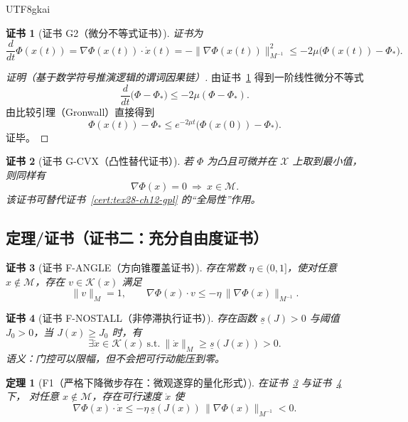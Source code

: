 \documentclass[12pt]{article}
\newtheorem{theorem}{定理}[section]
\newtheorem{Certificate}{证书}[section]
\begin{document}
\begin{CJK*}{UTF8}{gkai}
\begin{Certificate}[证书 G2（微分不等式证书）]
\label{cert:tex28-ch12-g2}
证书为
\[
  \frac{d}{dt}\Phi(x(t))
  =
  \nabla\Phi(x(t))\cdot\dot x(t)
  =
  -\|\nabla\Phi(x(t))\|_{M^{-1}}^2
  \le
  -2\mu\bigl(\Phi(x(t))-\Phi_*\bigr).
\]
\end{Certificate}

\begin{proof}[证明（基于数学符号推演逻辑的谓词因果链）]
由证书~\ref{cert:tex28-ch12-g2} 得到一阶线性微分不等式
\[
  \frac{d}{dt}\bigl(\Phi-\Phi_*\bigr)\le -2\mu(\Phi-\Phi_*).
\]
由比较引理（Gronwall）直接得到
\[
  \Phi(x(t))-\Phi_*
  \le
  e^{-2\mu t}\bigl(\Phi(x(0))-\Phi_*\bigr).
\]
证毕。
\end{proof}

\begin{Certificate}[证书 G-CVX（凸性替代证书）]
\label{cert:tex28-ch12-gcvx}
若 $\Phi$ 为凸且可微并在 $\mathcal{X}$ 上取到最小值\cite{rockafellar1970}，则同样有
\[
  \nabla\Phi(x)=0\ \Longrightarrow\ x\in\mathcal{M}.
\]
该证书可替代证书~\ref{cert:tex28-ch12-gpl} 的“全局性”作用。
\end{Certificate}

\subsection{定理/证书（证书二：充分自由度证书）}
\label{subsec:tex28-ch12-freedom-cert}

\begin{Certificate}[证书 F-ANGLE（方向锥覆盖证书）]
\label{cert:tex28-ch12-f-angle}
存在常数 $\eta\in(0,1]$，使对任意 $x\notin\mathcal{M}$，存在 $v\in\mathcal{K}(x)$ 满足
\[
  \|v\|_M=1,
  \qquad
  \boxed{
    \nabla\Phi(x)\cdot v
    \le
    -\eta\,\|\nabla\Phi(x)\|_{M^{-1}}
  }.
\]
\end{Certificate}

\begin{Certificate}[证书 F-NOSTALL（非停滞执行证书）]
\label{cert:tex28-ch12-f-nostall}
存在函数 $\underline s(J)>0$ 与阈值 $J_0>0$，当 $J(x)\ge J_0$ 时，有
\[
  \exists \dot x\in\mathcal{K}(x)\ \text{s.t.}\ \|\dot x\|_M\ge \underline s(J(x))>0.
\]
语义：门控可以限幅，但不会把可行动能压到零。
\end{Certificate}

\begin{theorem}[F1（严格下降微步存在：微观遂穿的量化形式）]
\label{thm:tex28-ch12-f1}
在证书~\ref{cert:tex28-ch12-f-angle} 与证书~\ref{cert:tex28-ch12-f-nostall} 下，
对任意 $x\notin\mathcal{M}$，存在可行速度 $\dot x$ 使
\[
  \nabla\Phi(x)\cdot\dot x
  \le
  -\eta\,\underline s(J(x))\,\|\nabla\Phi(x)\|_{M^{-1}}
  <0.
\]
\end{theorem}


\end{CJK*}
\end{document}
